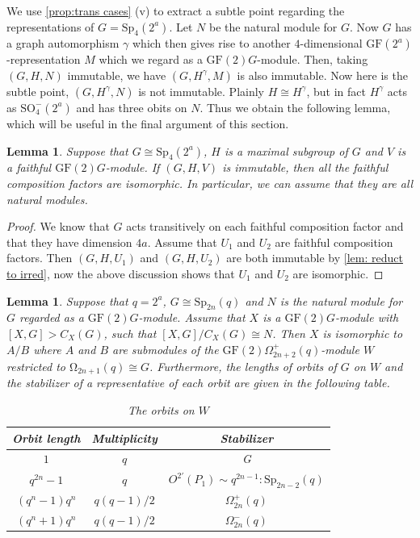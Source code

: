 \documentclass[12pt]{amsart}
\newtheorem{lemma}[theorem]{Lemma}
\theoremstyle{remark}
\theoremstyle{notation}
\theoremstyle{definition}
\newcommand{\GF}{\mathrm{GF}}
\newcommand{\Sp}{\mathrm{Sp}}
\newcommand{\0}{\emptyset}
\newcommand{\SO}{\mathrm{SO}}
\begin{document}
We use \cref{prop:trans cases} (v) to extract a subtle point regarding the representations of $G=\Sp_4(2^a)$. Let $N$ be the natural module for $G$.
Now $G$ has a graph automorphism $\gamma$ which then gives rise to another $4$-dimensional $\GF(2^a)$-representation $M$ which we regard as a $\GF(2)G$-module.  Then, taking $(G,H,N)$ immutable, we have $(G,H^\gamma,M)$ is also immutable. Now here is the subtle point, $(G,H^\gamma,N)$ is not immutable. Plainly $H \cong H^\gamma$, but in fact $H^\gamma$ acts as  $\SO_4^-(2^a)$ and   has three obits on $N$. Thus we obtain the following lemma, which will be useful in the final argument of this section.

\begin{lemma}\label{lem: sp4 all natural}
Suppose that $G\cong \Sp_4(2^a)$, $H$ is a maximal subgroup of $G$ and $V$ is a faithful $\GF(2)G$-module. If  $(G,H,V)$ is immutable, then all the faithful composition factors are isomorphic.  In particular, we can assume that they are all natural modules.
\end{lemma}

\begin{proof} We know that $G$ acts transitively on each  faithful composition factor and that they have dimension $4a$. Assume that $U_1$ and $U_2$ are faithful composition factors.  Then $(G,H,U_1)$ and $(G,H,U_2)$ are both immutable by \cref{lem: reduct to irred}, now the above discussion shows that $U_1$ and $U_2$ are isomorphic.
\end{proof}



\begin{lemma}\label{lem:symplectic fact}
Suppose that $q=2^a$, $G \cong \Sp_{2n}(q)$ and $N$ is the natural module for $G$ regarded as a $\GF(2)G$-module. Assume that $X$ is a $\GF(2)G$-module with $[X,G]>C_X(G)$, such that $[X,G]/C_X(G)\cong N$.  Then $X$ is isomorphic to $A/B$  where $A$ and $B$ are submodules of the $\GF(2)\Omega_{2n+2}^+(q)$-module $W$ restricted to $\mathrm \Omega_{2n+1}(q)\cong G$.  Furthermore, the lengths of orbits of $G$ on $W$ and the stabilizer of a representative of each orbit are given in the following table.

\begin{table}[h]
\begin{tabular}{|ccc |}
\hline
 {\rm Orbit length}&{\rm Multiplicity}&{\rm Stabilizer}\\
 \hline
$1$&$q$&G\\
 $q^{2n}-1$&$q$&$O^{2'}(P_1)\sim q^{2n-1}{:}\Sp_{2n-2}(q)$\\
 $(q^n-1)q^n$&$q(q-1)/2$&$\Omega_{2n}^+(q)$\\
 $(q^n+1)q^n$&$q(q-1)/2$&$\Omega_{2n}^-(q)$\\
\hline
\end{tabular}\vspace{3mm}\caption{The orbits on $W$}\label{tab:orbs on W}
\end{table}
\end{lemma}
\end{document}
